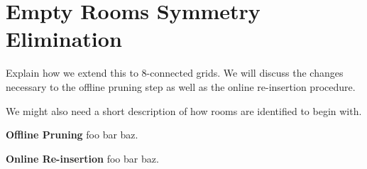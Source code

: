 \section{Empty Rooms Symmetry Elimination}
Explain how we extend this to 8-connected grids.
We will discuss the changes necessary to the offline
pruning step as well as the online re-insertion procedure.

We might also need a short description of how rooms are identified to begin with.

\textbf{Offline Pruning} foo bar baz.
\par
\textbf{Online Re-insertion} foo bar baz.
